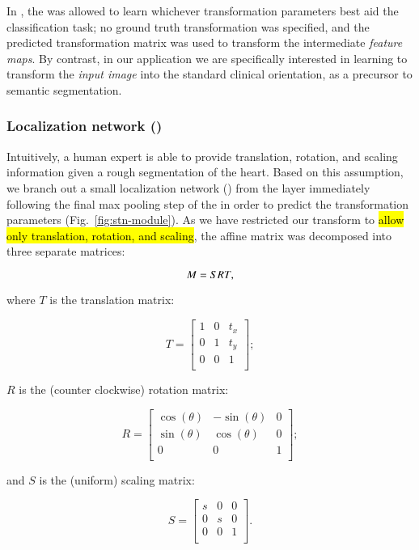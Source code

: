 In \citep{Jaderberg2015}, 
the \STN{} was allowed to learn whichever transformation parameters best aid the classification task; 
no ground truth transformation was specified, 
and the predicted transformation matrix was used to transform the intermediate \emph{feature maps}.
By contrast, in our application we are specifically interested in learning to transform the \emph{input image} into the standard clinical orientation, as a precursor to semantic segmentation.

\subsubsection{Localization network (\LocNet{})}

Intuitively, a human expert is able to provide translation, rotation, and scaling information given a rough segmentation of the heart.  Based on this assumption, we branch out a small localization network (\LocNet{}) from the layer immediately following the final max pooling step of the \UNet{} in order to predict the transformation parameters (Fig.~\ref{fig:stn-module}).  As we have restricted our transform to \hl{allow only translation, rotation, and scaling}, the affine matrix was decomposed into three separate matrices:

$$
M = SRT,
$$

\noindent where $T$ is the translation matrix:

$$
T =
\begin{bmatrix}
1 & 0 & t_x \\
0 & 1 & t_y \\
0 & 0 & 1 \\
\end{bmatrix};
$$

\noindent $R$ is the (counter clockwise) rotation matrix:

$$
R =
\begin{bmatrix}
\cos(\theta) & - \sin(\theta) & 0 \\
\sin(\theta) & \cos(\theta) & 0 \\
0 & 0 & 1 \\
\end{bmatrix};
$$

\noindent and $S$ is the (uniform) scaling matrix:

$$
S =
\begin{bmatrix}
s & 0 & 0 \\
0 & s & 0 \\
0 & 0 & 1 \\
\end{bmatrix}.
$$

